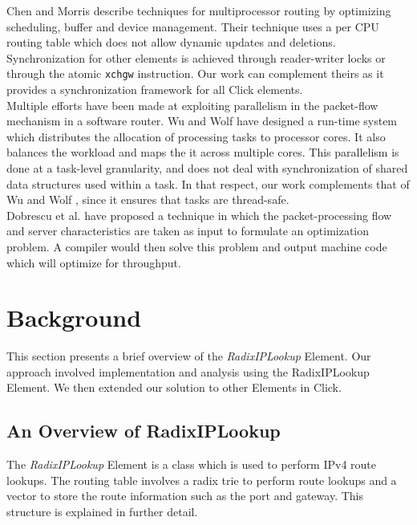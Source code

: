 \documentclass[a4paper,marginparwidth=50pt,marginparsep=10pt]{article}
\begin{document}
Chen and Morris \cite{chenmorris} describe techniques for multiprocessor routing by optimizing scheduling, buffer and device management. Their technique uses a per CPU routing table which does not allow dynamic updates and deletions. Synchronization for other elements is achieved through reader-writer locks or through the atomic \texttt{xchgw} instruction. Our work can complement theirs as it provides a synchronization framework for all Click elements.\\

Multiple efforts have been made at exploiting parallelism in the packet-flow mechanism in a software router. Wu and Wolf \cite{runtimepacketprocessing} have designed a run-time system which distributes the allocation of processing tasks to processor cores. It also balances the workload and maps the it across multiple cores. This parallelism is done at a task-level granularity, and does not deal with synchronization of shared data structures used within a task. In that respect, our work complements that of Wu and Wolf \cite{runtimepacketprocessing}, since it ensures that tasks are thread-safe.\\ 


Dobrescu et al. \cite{dobrescu} have proposed a technique in which the packet-processing flow and server characteristics are taken as input to formulate an optimization problem. A compiler would then solve this problem and output machine code which will optimize for throughput.
\section{Background}
\label{sec:background}
This section presents a brief overview of the \emph{RadixIPLookup} Element. Our approach involved implementation and analysis using the RadixIPLookup Element. We then extended our solution to other Elements in Click. 
\subsection{An Overview of RadixIPLookup}
The \emph{RadixIPLookup} Element \cite{radixiplookup} is a class which is used to perform IPv4 route lookups. The routing table involves a radix trie to perform route lookups and a vector to store the route information such as the port and gateway. This structure is explained in further detail. 
\end{document}
